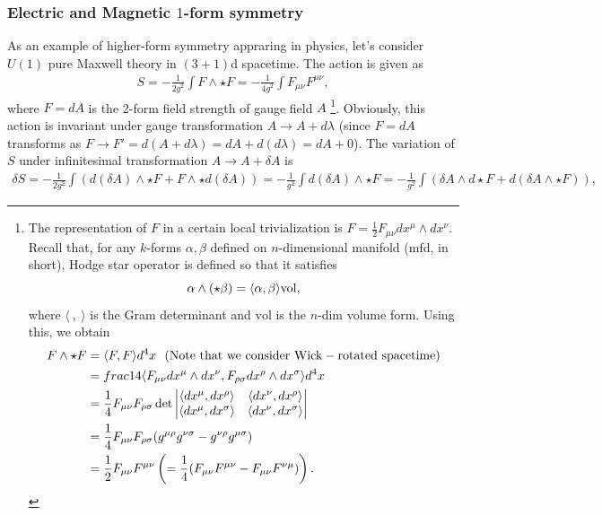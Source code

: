 \documentclass{ltjsarticle}
\theoremstyle{mystyle} %
\numberwithin{equation}{section}
\begin{document}
\subsubsection{Electric and Magnetic $1$-form symmetry}
As an example of higher-form symmetry appraring in physics, let's consider $U(1)$ pure Maxwell theory in $(3+1)$d spacetime. 
The action is given as 
\begin{align}
    S = -\frac{1}{2g^2} \int F\wedge \star F = -\frac{1}{4g^2}\int F_{\mu\nu}F^{\mu\nu}, 
    \label{U1pure}
\end{align}
where $F=dA$ is the 2-form field strength of gauge field $A$
\footnote{
    The representation of $F$ in a certain local trivialization is $F=\frac{1}{2}F_{\mu\nu}dx^\mu \wedge dx^\nu$. 
    Recall that, for any $k$-forms $\alpha, \beta$ defined on $n$-dimensional manifold (mfd, in short), 
    Hodge star operator is defined so that it satisfies
    $$\alpha\wedge (\star \beta)=\langle{\alpha, \beta}\rangle\mathrm{vol}, $$
    where $\langle ~ , ~ \rangle$ is the Gram determinant and $\mathrm{vol}$ is the $n$-dim volume form. 
    Using this, we obtain
    \begin{align}
        F\wedge \star F &= \langle{F, F}\rangle d^4 x~~(\mathrm{Note~that~we~consider~Wick-rotated~spacetime})\\
        &=frac{1}{4}\langle{F_{\mu\nu}dx^\mu\wedge dx^\nu, F_{\rho\sigma}dx^\rho\wedge dx^\sigma}\rangle d^4 x\\
        &=\frac{1}{4}F_{\mu\nu}F_{\rho\sigma}\det
        \begin{vmatrix}
            \langle{dx^\mu, dx^\rho}\rangle & \langle{dx^\nu, dx^\rho}\rangle\\
            \langle{dx^\mu, dx^\sigma}\rangle & \langle{dx^\nu, dx^\sigma}\rangle\\
        \end{vmatrix}\\
        &= \frac{1}{4}F_{\mu\nu}F_{\rho\sigma}(g^{\mu\rho}g^{\nu\sigma}-g^{\nu\rho}g^{\mu\sigma})\\
        &= \frac{1}{2}F_{\mu\nu}F^{\mu\nu} \left({=\frac{1}{4}(F_{\mu\nu}F^{\mu\nu}-F_{\mu\nu}F^{\nu\mu})}\right). 
    \end{align}
}. Obviously, this action is invariant under gauge transformation $A\to A+d\lambda$ (since $F=dA$ transforms as 
$F\to F' = d(A+d\lambda) = dA + d(d\lambda) = dA +0$). 
The variation of $S$ under infinitesimal transformation $A\to A + \delta A$ is 
\begin{align}
    \delta S= -\frac{1}{2g^2}\int (d(\delta A)\wedge \star F + F\wedge \star d(\delta A) )
    =-\frac{1}{g^2} \int d(\delta A)\wedge \star F 
    =-\frac{1}{g^2}\int (\delta A \wedge d \star F + d(\delta A \wedge \star F)), 
\end{align}
\end{document}
